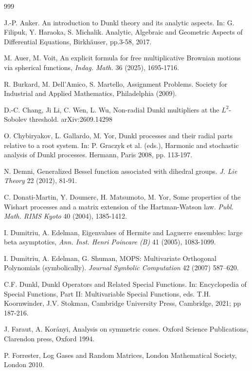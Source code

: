 \documentclass[reqno]{amsart}
\theoremstyle{plain}
\theoremstyle{definition}
\numberwithin{equation}{section}
\begin{document}
\begin{thebibliography}{999}
  
  J.-P. Anker.  An introduction to Dunkl theory and its analytic aspects. In: G. Filipuk,
 Y. Haraoka, S. Michalik. Analytic, Algebraic and Geometric Aspects of Differential Equations,
 Birkh{\"a}user, pp.3-58, 2017.

 M. Auer, M. Voit, An explicit formula for free multiplicative Brownian motions via spherical functions,
 \textit{Indag. Math.}  36 (2025), 1695-1716.

 R. Burkard, M. Dell'Amico, S. Martello, Assignment Problems. Society for Industrial and Applied Mathematics, Philadelphia (2009).

   D.-C. Chang, Ji Li,  C. Wen, L. Wu, Non-radial Dunkl multipliers at the $L^2$-Sobolev threshold. arXiv:2609.14298 

    O. Chybiryakov, L. Gallardo, M. Yor, Dunkl processes and their radial parts relative to a root system. In:
   P. Graczyk et al. (eds.), Harmonic and stochastic analysis of Dunkl processes. Hermann, Paris 2008, pp. 113-197.

 N. Demni, Generalized Bessel function associated with dihedral groups.
\textit{J. Lie Theory} 22 (2012),  81-91. 

 C. Donati-Martin, Y. Doumerc, H. Matsumoto, M. Yor, 
Some properties of the Wishart processes and a matrix extension of the Hartman-Watson law. 
\textit{Publ. Math. RIMS Kyoto} 40 (2004), 1385-1412.

  

  
   I. Dumitriu, A. Edelman, Eigenvalues of Hermite and Laguerre ensembles: large beta asymptotics,
    \textit{Ann. Inst. Henri Poincare (B)} 41 (2005), 1083-1099.

   I. Dumitriu, A. Edelman, G. Shuman, MOPS: Multivariate Orthogonal Polynomials (symbolically).
    \textit{ Journal  Symbolic Computation} 42 (2007) 587–620.

 C.F. Dunkl, Dunkl Operators and Related Special Functions.
 In:
Encyclopedia of Special Functions, Part II: Multivariable Special Functions, eds. T.H. Koornwinder, J.V.
Stokman, Cambridge University Press, Cambridge, 2021; pp 187-216.

 J. Faraut, A. Kor\'anyi, Analysis on symmetric cones. Oxford
 Science Publications,
 Clarendon press, Oxford 1994.

    P. Forrester, Log Gases and Random Matrices, London Mathematical Society, London 2010.


\end{thebibliography}
\end{document}
